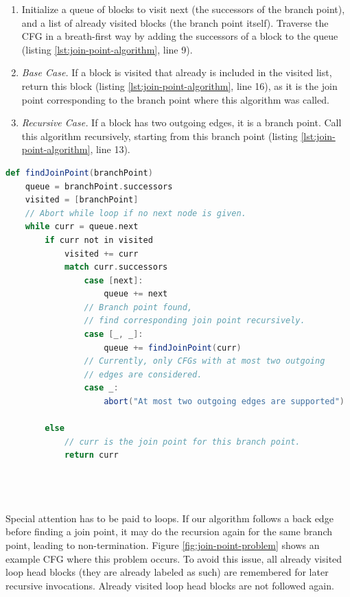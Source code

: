 \documentclass[11pt]{article}
\begin{document}
    \begin{enumerate}
        \item Initialize a queue of blocks to visit next (the successors of the branch point),
            and a list of already visited blocks (the branch point itself).
            Traverse the CFG in a breath-first way by adding the successors of a block
            to the queue (listing \ref{lst:join-point-algorithm}, line 9).
        \item \emph{Base Case.} If a block is visited that already is included in the visited list,
            return this block (listing \ref{lst:join-point-algorithm}, line 16), as it is the join point corresponding to the branch point where this algorithm was called.
        \item \emph{Recursive Case.} If a block has two outgoing edges, it is a branch point.
            Call this algorithm recursively, starting from this branch point (listing \ref{lst:join-point-algorithm}, line 13).
    \end{enumerate}

    \begin{lstlisting}[language=Scala, caption={The join point finding algorithm without support for loops.}, label={lst:join-point-algorithm}]
def findJoinPoint(branchPoint)
    queue = branchPoint.successors
    visited = [branchPoint]
    // Abort while loop if no next node is given.
    while curr = queue.next
        if curr not in visited
            visited += curr
            match curr.successors
                case [next]:
                    queue += next
                // Branch point found,
                // find corresponding join point recursively.
                case [_, _]:
                    queue += findJoinPoint(curr)
                // Currently, only CFGs with at most two outgoing
                // edges are considered.
                case _:
                    abort("At most two outgoing edges are supported")

        else
            // curr is the join point for this branch point.
            return curr

    
        
    \end{lstlisting}

    Special attention has to be paid to loops. If our algorithm follows a back edge before finding a join point,
    it may do the recursion again for the same branch point, leading to non-termination.
    Figure \ref{fig:join-point-problem} shows an example CFG where this problem occurs.
    To avoid this issue, all already visited loop head blocks (they are already labeled as such)
    are remembered for later recursive invocations. Already visited loop head blocks are not followed again.
    
\end{document}
